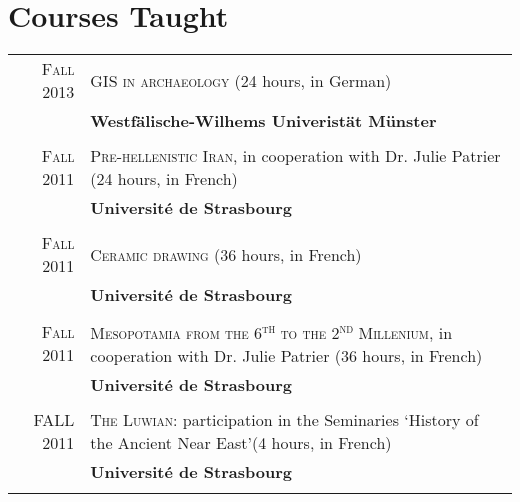 \section{Courses Taught}

\begin{tabular}{rl}
\textsc{Fall 2013} & \textsc{GIS in archaeology}  (24 hours, in German) \\
&  \small{\textbf{Westfälische-Wilhems Univeristät Münster}} \\
\multicolumn{2}{c}{} \\

\textsc{Fall 2011} & \textsc{Pre-hellenistic Iran}, in cooperation with Dr.
Julie Patrier (24 hours, in French) \\
&  \small{\textbf{Université de Strasbourg}} \\
\multicolumn{2}{c}{} \\

\textsc{Fall 2011} & \textsc{Ceramic drawing} (36 hours, in French)\\
&  \small{\textbf{Université de Strasbourg}} \\
\multicolumn{2}{c}{} \\

\textsc{Fall 2011} & \textsc{Mesopotamia from the 6\textsuperscript{th} to the
2\textsuperscript{nd} Millenium}, in cooperation with Dr. Julie Patrier (36
hours, in French) \\
&  \small{\textbf{Université de Strasbourg}} \\
\multicolumn{2}{c}{} \\

\textsc{FALL 2011} & \textsc{The Luwian}: participation in the Seminaries
\textquoteleft History of the Ancient Near East\textquoteright (4 hours, in
French)\\
&  \small{\textbf{Université de Strasbourg}} \\
\multicolumn{2}{c}{} \\
\end{tabular}
